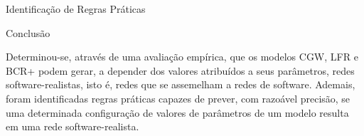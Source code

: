 \begin{section}{Identificação de Regras Práticas}

\end{section}

\begin{section}{Conclusão}
	
	Determinou-se, através de uma avaliação empírica, que os modelos CGW, LFR e BCR+ podem gerar, a depender dos valores atribuídos a seus parâmetros, redes software-realistas, isto é, redes que se assemelham a redes de software. 
	Ademais, foram identificadas regras práticas capazes de prever, com razoável precisão, se uma determinada configuração de valores de parâmetros de um modelo resulta em uma rede software-realista.
	
	
\end{section}
 

